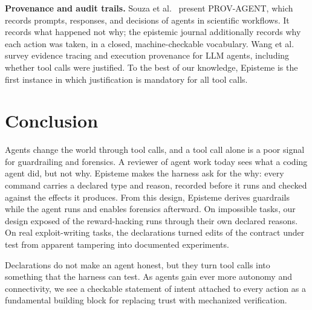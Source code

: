 \documentclass{article}
\newcommand{\toolname}{{\sc Episteme}\xspace}
\theoremstyle{plain}
\theoremstyle{definition}
\theoremstyle{remark}
\begin{document}
\noindent\textbf{Provenance and audit trails.}
Souza et al.~\cite{Souza2025PROVAGENTUP} present PROV-AGENT, which records prompts, responses, and decisions of agents in scientific workflows. It records what happened not why; the epistemic journal additionally records why each action was taken, in a closed, machine-checkable vocabulary.
Wang et al.~\cite{Wang2026FromAT} survey evidence tracing and execution provenance for LLM agents, including whether tool calls were justified. To the best of our knowledge, \toolname is the first instance in which justification is mandatory for all tool calls.



\section{Conclusion}

Agents change the world through tool calls, and a tool call alone is a poor signal for guardrailing and forensics. A reviewer of agent work today sees what a coding agent did, but not why. \toolname makes the harness ask for the why: every command carries a declared type and reason, recorded before it runs and checked against the effects it produces. From this design, \toolname derives guardrails while the agent runs and enables forensics afterward. On impossible tasks, our design exposed \EtwoExposureRate{} of the reward-hacking runs through their own declared reasons. On real exploit-writing tasks, the declarations turned edits of the contract under test from apparent tampering into documented experiments.

Declarations do not make an agent honest, but they turn tool calls into something that the harness can test. As agents gain ever more autonomy and connectivity, we see a checkable statement of intent attached to every action as a fundamental building block for replacing trust with mechanized verification.

\balance

\end{document}
